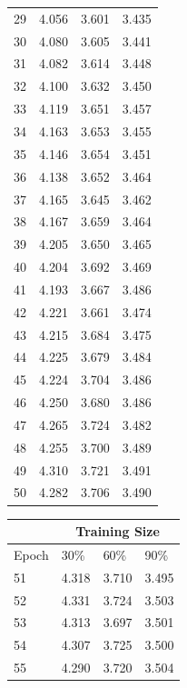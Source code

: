 \documentclass[12pt]{article}
\begin{document}
\begin{center}
\begin{tabular}{|l || l| l| l|}
            29 & 4.056 & 3.601 & 3.435 \\
            30 & 4.080 & 3.605 & 3.441 \\
            31 & 4.082 & 3.614 & 3.448 \\
            32 & 4.100 & 3.632 & 3.450 \\
            33 & 4.119 & 3.651 & 3.457 \\
            34 & 4.163 & 3.653 & 3.455 \\
            35 & 4.146 & 3.654 & 3.451 \\
            36 & 4.138 & 3.652 & 3.464 \\
            37 & 4.165 & 3.645 & 3.462 \\
            38 & 4.167 & 3.659 & 3.464 \\
            39 & 4.205 & 3.650 & 3.465 \\
            40 & 4.204 & 3.692 & 3.469 \\
            41 & 4.193 & 3.667 & 3.486 \\
            42 & 4.221 & 3.661 & 3.474 \\
            43 & 4.215 & 3.684 & 3.475 \\
            44 & 4.225 & 3.679 & 3.484 \\
            45 & 4.224 & 3.704 & 3.486 \\
            46 & 4.250 & 3.680 & 3.486 \\
            47 & 4.265 & 3.724 & 3.482 \\
            48 & 4.255 & 3.700 & 3.489 \\
            49 & 4.310 & 3.721 & 3.491 \\
            50 & 4.282 & 3.706 & 3.490 \\
            \hline
          \end{tabular}
          \begin{tabular}{|l || l| l| l|}
            \hline
            &\multicolumn{3}{|c|}{Training Size} \\
            \hline
            Epoch & 30\% & 60\% & 90\% \\
            \hline
            51 & 4.318 & 3.710 & 3.495 \\
            52 & 4.331 & 3.724 & 3.503 \\
            53 & 4.313 & 3.697 & 3.501 \\
            54 & 4.307 & 3.725 & 3.500 \\
            55 & 4.290 & 3.720 & 3.504 \\

\end{tabular}
\end{center}
\end{document}
